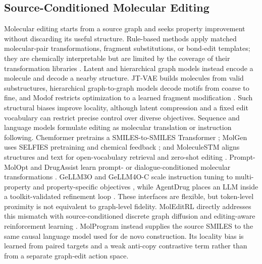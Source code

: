 \documentclass{article}
\begin{document}
\subsection{Source-Conditioned Molecular Editing}
Molecular editing starts from a source graph and seeks property improvement
without discarding its useful structure. Rule-based methods apply matched
molecular-pair transformations, fragment substitutions, or bond-edit templates;
they are chemically interpretable but are limited by the coverage of their
transformation libraries \citep{hussain2010mmp}. Latent and hierarchical graph
models instead encode a molecule and decode a nearby structure. JT-VAE builds
molecules from valid substructures, hierarchical graph-to-graph models decode
motifs from coarse to fine, and Modof restricts optimization to a learned
fragment modification \citep{jin2018jtvae,jin2020hierarchical,chen2021modof}.
Such structural biases improve locality, although latent compression and a
fixed edit vocabulary can restrict precise control over diverse objectives.
Sequence and language models formulate editing as molecular translation or
instruction following. Chemformer pretrains a SMILES-to-SMILES Transformer
\citep{irwin2022chemformer}; MolGen uses SELFIES pretraining and chemical
feedback \citep{fang2024molgen}; and MoleculeSTM aligns structures and text for
open-vocabulary retrieval and zero-shot editing \citep{liu2023moleculestm}.
Prompt-MolOpt and DrugAssist learn prompt- or dialogue-conditioned molecular
transformations \citep{wu2024promptmolopt,ye2025drugassist}. GeLLM3O and
GeLLM4O-C scale instruction tuning to multi-property and property-specific
objectives \citep{dey2025gellm3o,dey2025controllable}, while AgentDrug places an
LLM inside a toolkit-validated refinement loop \citep{le2025agentdrug}. These
interfaces are flexible, but token-level proximity is not equivalent to
graph-level fidelity. MolEditRL directly addresses this mismatch with
source-conditioned discrete graph diffusion and editing-aware reinforcement
learning \citep{zhuang2026moleditrl}. MolProgram instead supplies the source
SMILES to the same causal language model used for de novo construction. Its
locality bias is learned from paired targets and a weak anti-copy contrastive
term rather than from a separate graph-edit action space.
\end{document}
